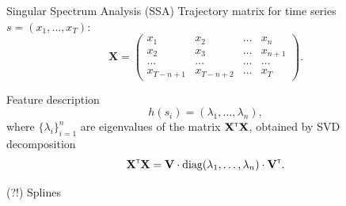 \documentclass{beamer}
\newcommand{\T}{{\text{\tiny\sffamily\upshape\mdseries T}}}
\begin{document}
\begin{frame}{Singular Spectrum Analysis (SSA)}
	Trajectory matrix for time series $s = (x_1, \dots, x_T)$:
	\[
		\mathbf{X} = 
		\begin{pmatrix}
			x_1 & x_2 & \dots & x_n \\
			x_2 & x_3 & \dots & x_{n+1} \\
			\dots & \dots & \dots & \dots\\
			x_{T-n+1} & x_{T-n+2} & \dots & x_{T}
		\end{pmatrix}.
	\]
	
	\begin{block}{Feature description}
		\[
			h(s_i) = (\lambda_1, \dots ,\lambda_n),
		\]
		where $\{\lambda_i\}_{i=1}^n$ are eigenvalues of the matrix $\mathbf{X}^{\T} \mathbf{X}$, obtained by SVD decomposition
		\[
			\mathbf{X}^{\T} \mathbf{X} = \mathbf{V} \cdot \text{diag} (\lambda_1, \dots, \lambda_n) \cdot \mathbf{V}^{\T}.
		\]
	\end{block}

\end{frame}
\begin{frame}{(?!) Splines}

\end{frame}
\end{document}

